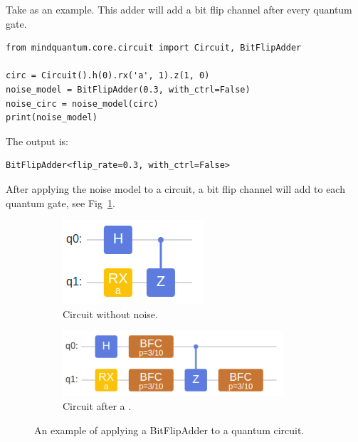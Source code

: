 Take \BitFlipAdder as an example. This adder will add a bit flip channel after every quantum gate.
\begin{lstlisting}
from mindquantum.core.circuit import Circuit, BitFlipAdder

circ = Circuit().h(0).rx('a', 1).z(1, 0)
noise_model = BitFlipAdder(0.3, with_ctrl=False)
noise_circ = noise_model(circ)
print(noise_model)
\end{lstlisting}
The output is:
\begin{lstlisting}
BitFlipAdder<flip_rate=0.3, with_ctrl=False>
\end{lstlisting}
After applying the noise model to a circuit, a bit flip channel will add to each quantum gate, see Fig~\ref{fig:bit_flip_adder}.
\begin{figure}
    \centering
    \begin{subfigure}{0.2\textwidth}
        \centering
        \includegraphics[width=\textwidth]{images/4_3_no_bit_fip.png}
        \caption{Circuit without noise.}
    \end{subfigure}
    \begin{subfigure}{0.4\textwidth}
        \centering
        \includegraphics[width=0.9\textwidth]{images/4_3_bit_fip.png}
        \caption{Circuit after a .}
    \end{subfigure}
    \caption{An example of applying a BitFlipAdder to a quantum circuit.}
    \label{fig:bit_flip_adder}
\end{figure}


